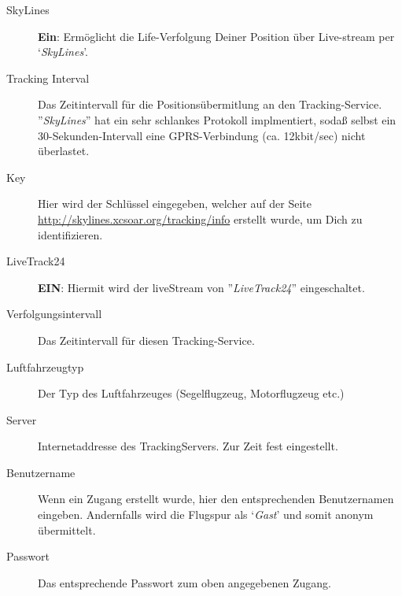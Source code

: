 \begin{description}
\item[SkyLines] {\bf Ein}: Ermöglicht die Life-Verfolgung Deiner Position über Live-stream per `{\em SkyLines}'.
\item[Tracking Interval]  Das Zeitintervall für die Positionsübermitlung an den Tracking-Service.
''{\em SkyLines}''  hat ein sehr schlankes Protokoll implmentiert, sodaß selbst  ein 30-Sekunden-Intervall eine GPRS-Verbindung (ca. 12kbit/sec) nicht überlastet.
\item[Key] Hier wird der Schlüssel eingegeben, welcher auf der Seite \url{http://skylines.xcsoar.org/tracking/info}
erstellt wurde, um Dich zu identifizieren.
\\
\item[LiveTrack24]  {\bf EIN}: Hiermit wird der liveStream von  ''{\em LiveTrack24}'' eingeschaltet.
\item[Verfolgungsintervall] Das Zeitintervall für diesen Tracking-Service.
\item[Luftfahrzeugtyp]  Der Typ des Luftfahrzeuges (Segelflugzeug, Motorflugzeug etc.)
\item[Server] Internetaddresse des TrackingServers. Zur Zeit fest eingestellt.
\item[Benutzername] Wenn ein Zugang erstellt wurde, hier den entsprechenden Benutzernamen eingeben.
Andernfalls wird die Flugspur als `{\it Gast}'  und somit anonym übermittelt.
\item[Passwort] Das entsprechende Passwort zum oben angegebenen  Zugang.
\end{description}
